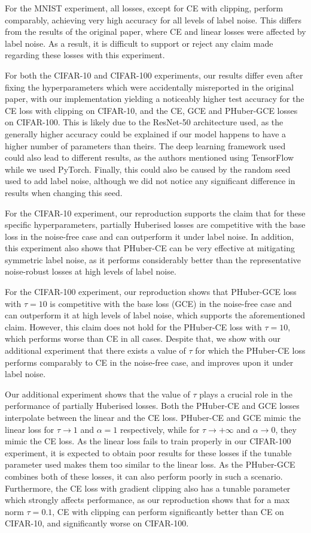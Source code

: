 For the MNIST experiment, all losses, except for CE with clipping, perform comparably, achieving very high accuracy for all levels of label noise. This differs from the results of the original paper, where CE and linear losses were affected by label noise. As a result, it is difficult to support or reject any claim made regarding these losses with this experiment.

For both the CIFAR-10 and CIFAR-100 experiments, our results differ even after fixing the hyperparameters which were accidentally misreported in the original paper, with our implementation yielding a noticeably higher test accuracy for the CE loss with clipping on CIFAR-10, and the CE, GCE and PHuber-GCE losses on CIFAR-100. This is likely due to the ResNet-50 architecture used, as the generally higher accuracy could be explained if our model happens to have a higher number of parameters than theirs. The deep learning framework used could also lead to different results, as the authors mentioned using TensorFlow while we used PyTorch. Finally, this could also be caused by the random seed used to add label noise, although we did not notice any significant difference in results when changing this seed.

For the CIFAR-10 experiment, our reproduction supports the claim that for these specific hyperparameters, partially Huberised losses are competitive with the base loss in the noise-free case and can outperform it under label noise. In addition, this experiment also shows that PHuber-CE can be very effective at mitigating symmetric label noise, as it performs considerably better than the representative noise-robust losses at high levels of label noise. 

For the CIFAR-100 experiment, our reproduction shows that PHuber-GCE loss with $\tau=10$ is competitive with the base loss (GCE) in the noise-free case and can outperform it at high levels of label noise, which supports the aforementioned claim. However, this claim does not hold for the PHuber-CE loss with $\tau=10$, which performs worse than CE in all cases. Despite that, we show with our additional experiment that there exists a value of $\tau$ for which the PHuber-CE loss performs comparably to CE in the noise-free case, and improves upon it under label noise.

Our additional experiment shows that the value of $\tau$ plays a crucial role in the performance of partially Huberised losses. Both the PHuber-CE and GCE losses interpolate between the linear and the CE loss. PHuber-CE and GCE mimic the linear loss for $\tau \rightarrow 1$ and $\alpha = 1$ respectively, while for $\tau \rightarrow +\infty$ and $\alpha \rightarrow 0$, they mimic the CE loss. As the linear loss fails to train properly in our CIFAR-100 experiment, it is expected to obtain poor results for these losses if the tunable parameter used makes them too similar to the linear loss. As the PHuber-GCE combines both of these losses, it can also perform poorly in such a scenario. Furthermore, the CE loss with gradient clipping also has a tunable parameter which strongly affects performance, as our reproduction shows that for a max norm $\tau=0.1$, CE with clipping can perform significantly better than CE on CIFAR-10, and significantly worse on CIFAR-100.

